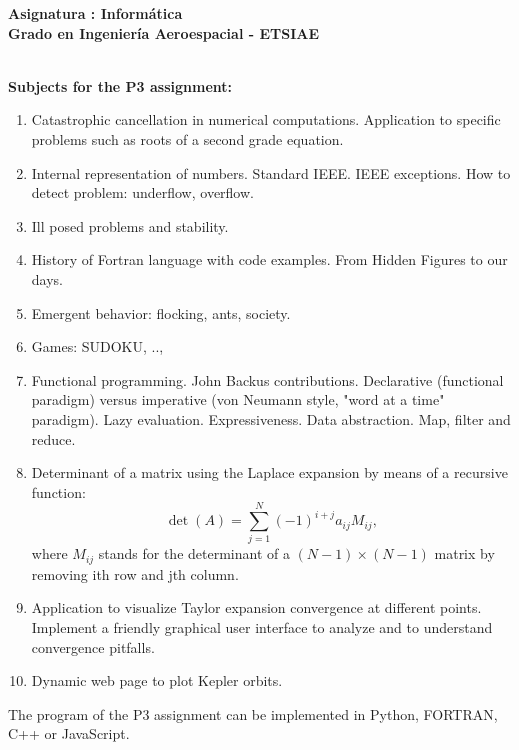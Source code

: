 \documentclass[12pt,spanish]{article}
\begin{document}
\begin{center}
	{\bf \Large Asignatura : 
	Informática}                                               
	\\ \vspace{1cm}
	{\bf \Large Grado en Ingeniería Aeroespacial - 
	ETSIAE}                                            \\
	               \\
\end{center}

\vspace{1cm}

\noindent
{\bf \Large Subjects for the P3 assignment: 
}                                                                               
     
\vspace{0.5cm}

\begin{enumerate}

\item Catastrophic cancellation in numerical computations. Application to 
specific problems such as roots of a second grade equation. 

\item Internal representation of numbers. Standard IEEE. IEEE exceptions. 
How to detect problem: underflow, overflow. 

\item Ill posed problems and stability. 

\item History of Fortran language with code examples. From Hidden Figures to 
our days. 

\item Emergent behavior: flocking, ants, society. 
\item Games: SUDOKU, ..,
\item Functional programming. John Backus contributions. Declarative 
(functional paradigm) versus imperative (von Neumann style, "word at a time" 
paradigm). Lazy evaluation. Expressiveness. Data abstraction. Map, filter and 
reduce. 

\item Determinant of a matrix using the Laplace expansion by means of a 
recursive function:  
$$ 
   \det(A) = \sum _{j=1} ^N (-1)^{i+j} a_{ij} M_{ij}, 
$$
where $ M_{ij} $ stands for the determinant of a $ (N-1) \times (N-1) $ matrix 
by removing ith row and jth column. 

\item Application to visualize Taylor expansion convergence at different 
points. Implement a friendly graphical user interface to analyze and to 
understand convergence pitfalls. 

\item Dynamic web page to plot Kepler orbits. 
 
\end{enumerate}
The program of the  P3 assignment can be implemented in Python, FORTRAN, C++ or JavaScript. 
\end{document}
